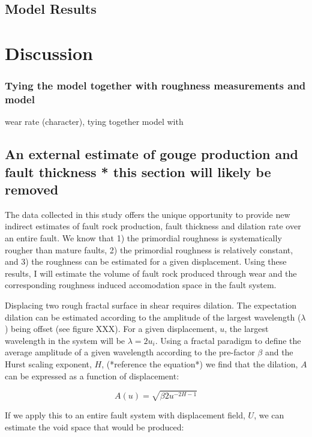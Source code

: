 \documentclass[12pt,a4paper]{article}
\begin{document}
	\subsection{Model Results}

\section{Discussion}
	\subsubsection{Tying the model together with roughness measurements and model}
wear rate (character), tying together model with 



	\subsection{An external estimate of gouge production and fault thickness * this section will likely be removed}

The data collected in this study offers the unique opportunity to provide new indirect estimates of fault rock production, fault thickness and dilation rate over an entire fault. We know that 1) the primordial roughness is systematically rougher than mature faults, 2) the primordial roughness is relatively constant, and 3) the roughness can be estimated for a given displacement. Using these results, I will estimate the volume of fault rock produced through wear and the corresponding roughness induced accomodation space in the fault system.

Displacing two rough fractal surface in shear requires dilation. The expectation dilation can be estimated according to the amplitude of the largest wavelength ($\lambda$) being offset (see figure XXX). For a given displacement, $u$, the largest wavelength in the system will be $\lambda = 2u_i$. Using a fractal paradigm to define the average amplitude of a given wavelength according to the pre-factor $\beta$ and the Hurst scaling exponent, $H$, (*reference the equation*) we find that the dilation, $A$ can be expressed as a function of displacement:

\begin{equation}
	A(u) = \sqrt{\beta 2u^{-2H-1}}
\end{equation}

If we apply this to an entire fault system with displacement field, $U$, we can estimate the void space that would be produced:
\end{document}
